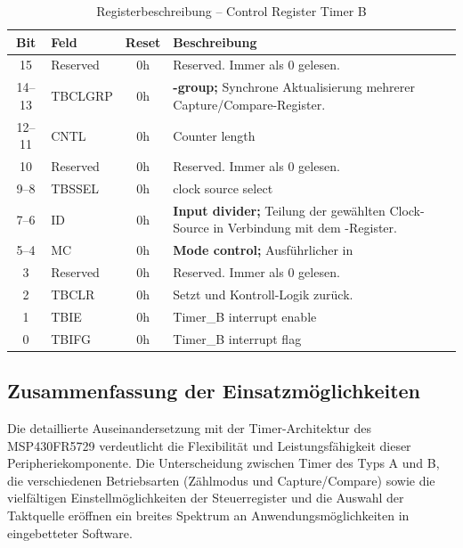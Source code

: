 \begin{table}[h!]
	\small
	\centering
	\begin{tabular}{|c|l|c|p{9.4cm}|}
		\hline
		\textbf{Bit} & \textbf{Feld} & \textbf{Reset} & \textbf{Beschreibung} \\ \hline
		15 & Reserved & 0h & Reserved. Immer als 0 gelesen. \\ \hline
		14–13 & TBCLGRP & 0h & \textbf{\Code{TBxCLn}-group;} Synchrone Aktualisierung mehrerer Capture/Compare-Register. \\ \hline
		12–11 & CNTL & 0h & Counter length \\ \hline
		10 & Reserved & 0h & Reserved. Immer als 0 gelesen. \\ \hline
		9–8 & TBSSEL & 0h & clock source select \\ \hline
		7–6 & ID & 0h & \textbf{Input divider;} Teilung der gew\"ahlten Clock-Source in Verbindung mit dem \Code{TBIDEX}-Register. \\ \hline
		5–4 & MC & 0h & \textbf{Mode control;} Ausf\"uhrlicher in \Kapitel{Timer_CountMode} \\ \hline
		3 & Reserved & 0h & Reserved. Immer als 0 gelesen. \\ \hline
		2 & TBCLR & 0h & Setzt \Code{TBR} und Kontroll-Logik zur\"uck. \\ \hline
		1 & TBIE & 0h & Timer\_B interrupt enable \\ \hline
		0 & TBIFG & 0h & Timer\_B interrupt flag \\ \hline
	\end{tabular}
	\caption{Registerbeschreibung – Control Register Timer B\\}
	\label{tab:tb_c_register}
\end{table}

\subsection{Zusammenfassung der Einsatzm\"oglichkeiten}
\label{sec:TimerEinsatzmoeglichkeiten}

Die detaillierte Auseinandersetzung mit der Timer-Architektur des MSP430FR5729 verdeutlicht die Flexibilit\"at und Leistungsf\"ahigkeit dieser Peripheriekomponente. Die Unterscheidung zwischen Timer des Typs A und B, die verschiedenen Betriebsarten (Z\"ahlmodus und Capture/Compare) sowie die vielf\"altigen Einstellm\"oglichkeiten der Steuerregister und die Auswahl der Taktquelle er\"offnen ein breites Spektrum an Anwendungsm\"oglichkeiten in eingebetteter Software.


